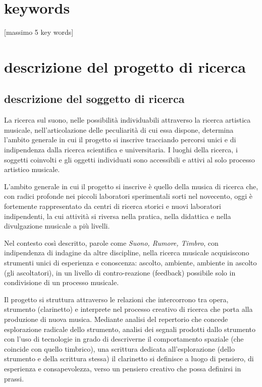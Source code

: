 \documentclass{gs-adonis}
\begin{document}
%
%


\section*{keywords}

[massimo 5 key words]


\section{descrizione del progetto di ricerca}%

\subsection{descrizione del soggetto di ricerca}%


La ricerca sul suono, nelle possibilità individuabili attraverso la ricerca
artistica musicale, nell'articolazione delle peculiarità di cui essa dispone,
determina l'ambito generale in cui il progetto si inscrive tracciando percorsi
unici e di indipendenza dalla ricerca scientifica e universitaria. I luoghi
della ricerca, i soggetti coinvolti e gli oggetti individuati sono accessibili
e attivi al solo processo artistico musicale.

L'ambito generale in cui il progetto si inscrive è quello della musica di
ricerca che, con radici profonde nei piccoli laboratori sperimentali sorti nel
novecento, oggi è fortemente rappresentato da centri di ricerca storici e
nuovi laboratori indipendenti, la cui attività si riversa nella pratica, nella
didattica e nella divulgazione musicale a più livelli.

Nel contesto così descritto, parole come \emph{Suono, Rumore, Timbro},
con indipendenza di indagine da altre discipline, nella ricerca musicale
acquisiscono strumenti unici di esperienza e conoscenza: ascolto, ambiente,
ambiente in ascolto (gli ascoltatori), in un livello di contro-reazione
(feedback) possibile solo in condivisione di un processo musicale.

Il progetto si struttura attraverso le relazioni che intercorrono tra
opera, strumento (clarinetto) e interprete nel processo creativo di ricerca che
porta alla produzione di nuova musica. Mediante analisi del repertorio che
concede esplorazione radicale dello strumento, analisi dei segnali prodotti
dallo strumento con l'uso di tecnologie in grado di descriverne il
comportamento spaziale (che coincide con quello timbrico), una scrittura
dedicata all'esplorazione (dello strumento e della scrittura stessa) il
clarinetto si definisce a luogo di pensiero, di esperienza e
consapevolezza, verso un pensiero creativo che possa definirsi in prassi.
\end{document}
